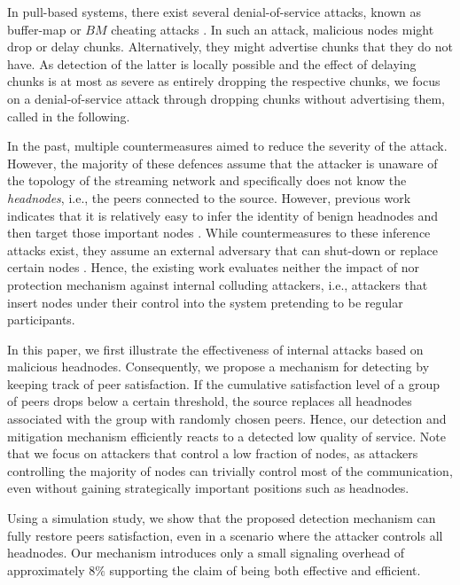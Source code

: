 In pull-based systems, there exist several denial-of-service attacks, known as buffer-map or $BM$ cheating attacks \cite{cheatingAnalysis}. 
In such an attack, malicious nodes might drop or delay chunks. Alternatively, they might advertise chunks that they do not have. As detection of the latter is locally possible and the effect of delaying chunks is at most as severe as entirely dropping the respective chunks, we focus on a denial-of-service attack through dropping chunks without advertising them, called \drop in the following.  


In the past, multiple countermeasures aimed to reduce the severity of the \drop attack. However, the majority of these defences \cite{zhang2005coolstreaming, defending2, antiliar} assume that the attacker is unaware of the topology of the streaming network and specifically does not know the \emph{headnodes}, i.e., the peers connected to the source. 
However, previous work indicates that it is relatively easy to infer the identity of benign headnodes and then target those important nodes \cite{nguyen2016swap}.
While countermeasures to these inference attacks exist, they assume an external adversary that can shut-down or replace certain nodes \cite{nguyen2016swap, rbcs, nguyen2014resilience}. 
Hence, the existing work evaluates neither the impact of nor protection mechanism against internal colluding attackers, i.e., attackers that insert nodes under their control into the system pretending to be regular participants. 


In this paper, we first illustrate the effectiveness of internal attacks based on malicious headnodes. 
Consequently, we propose a mechanism for detecting \drop by keeping track of peer satisfaction. If the cumulative satisfaction level of a group of peers drops below a certain threshold, the source replaces all headnodes associated with the group with randomly chosen peers. 
Hence, our detection and mitigation mechanism efficiently reacts to a detected low quality of service.
Note that we focus on attackers that control a low fraction of nodes, as attackers controlling the majority of nodes can trivially control most of the communication, even without gaining strategically important positions such as headnodes.    

Using a simulation study, we show that the proposed detection mechanism can fully restore peers satisfaction, even in a scenario where the attacker controls all headnodes. 
Our mechanism introduces only a small signaling overhead of approximately $8\%$ supporting the claim of being both effective and efficient.

